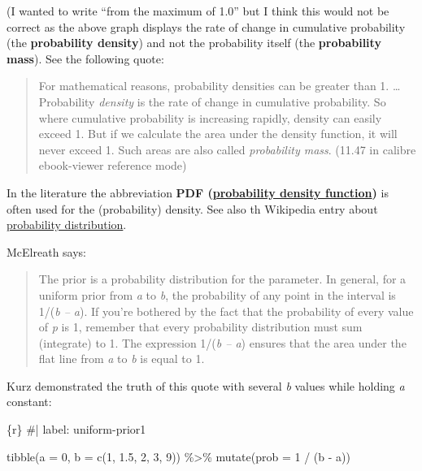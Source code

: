\documentclass[
  letterpaper,
  DIV=11,
  numbers=noendperiod]{scrreprt}
\newenvironment{Shaded}{\begin{snugshade}}{\end{snugshade}}
\newcommand{\AttributeTok}[1]{\textcolor[rgb]{0.40,0.45,0.13}{#1}}
\newcommand{\CommentTok}[1]{\textcolor[rgb]{0.37,0.37,0.37}{#1}}
\newcommand{\DecValTok}[1]{\textcolor[rgb]{0.68,0.00,0.00}{#1}}
\newcommand{\FloatTok}[1]{\textcolor[rgb]{0.68,0.00,0.00}{#1}}
\newcommand{\FunctionTok}[1]{\textcolor[rgb]{0.28,0.35,0.67}{#1}}
\newcommand{\InformationTok}[1]{\textcolor[rgb]{0.37,0.37,0.37}{#1}}
\newcommand{\NormalTok}[1]{\textcolor[rgb]{0.00,0.23,0.31}{#1}}
\newcommand{\SpecialCharTok}[1]{\textcolor[rgb]{0.37,0.37,0.37}{#1}}
\begin{document}
(I wanted to write ``from the maximum of 1.0'' but I think this would
not be correct as the above graph displays the rate of change in
cumulative probability (the \textbf{probability density}) and not the
probability itself (the \textbf{probability mass}). See the following
quote:

\begin{quote}
For mathematical reasons, probability densities can be greater than 1.
\ldots{} Probability \emph{density} is the rate of change in cumulative
probability. So where cumulative probability is increasing rapidly,
density can easily exceed 1. But if we calculate the area under the
density function, it will never exceed 1. Such areas are also called
\emph{probability mass}. (11.47 in calibre ebook-viewer reference mode)
\end{quote}

In the literature the abbreviation \textbf{PDF
(\href{https://en.wikipedia.org/wiki/Probability_density_function}{probability
density function})} is often used for the (probability) density. See
also th Wikipedia entry about
\href{https://en.wikipedia.org/wiki/Probability_distribution}{probability
distribution}.

McElreath says:

\begin{quote}
The prior is a probability distribution for the parameter. In general,
for a uniform prior from \emph{a} to \emph{b}, the probability of any
point in the interval is 1/(\emph{b -- a}). If you're bothered by the
fact that the probability of every value of \emph{p} is 1, remember that
every probability distribution must sum (integrate) to 1. The expression
1/(\emph{b -- a}) ensures that the area under the flat line from
\emph{a} to \emph{b} is equal to 1.
\end{quote}

Kurz demonstrated the truth of this quote with several \emph{b} values
while holding \emph{a} constant:

\begin{Shaded}
\begin{Highlighting}[]
\InformationTok{\textasciigrave{}\textasciigrave{}\textasciigrave{}\{r\}}
\CommentTok{\#| label: uniform{-}prior1}

\FunctionTok{tibble}\NormalTok{(}\AttributeTok{a =} \DecValTok{0}\NormalTok{,}
       \AttributeTok{b =} \FunctionTok{c}\NormalTok{(}\DecValTok{1}\NormalTok{, }\FloatTok{1.5}\NormalTok{, }\DecValTok{2}\NormalTok{, }\DecValTok{3}\NormalTok{, }\DecValTok{9}\NormalTok{)) }\SpecialCharTok{\%\textgreater{}\%} 
  \FunctionTok{mutate}\NormalTok{(}\AttributeTok{prob =} \DecValTok{1} \SpecialCharTok{/}\NormalTok{ (b }\SpecialCharTok{{-}}\NormalTok{ a))}
\InformationTok{\textasciigrave{}\textasciigrave{}\textasciigrave{}}
\end{Highlighting}
\end{Shaded}
\end{document}
